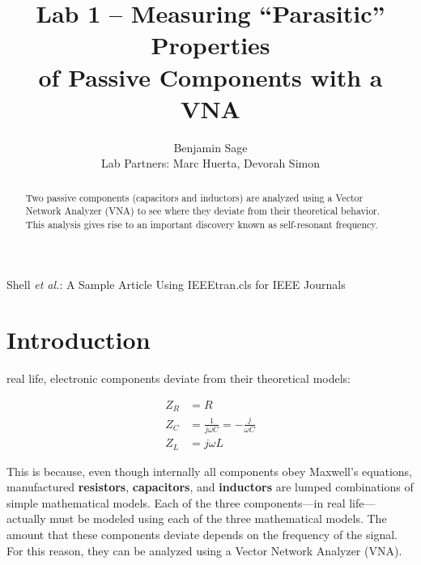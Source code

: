 \documentclass[lettersize,journal]{IEEEtran}
\begin{document}
\title{Lab 1 -- Measuring ``Parasitic'' Properties\\of Passive Components with a VNA}

\author{Benjamin Sage\\Lab Partners: Marc Huerta, Devorah Simon}

%
{Shell \MakeLowercase{\textit{et al.}}: A Sample Article Using IEEEtran.cls for IEEE Journals}


\maketitle

\begin{abstract}

Two passive components (capacitors and inductors) are analyzed using a Vector Network Analyzer (VNA) to see where they deviate from their theoretical behavior. This analysis gives rise to an important discovery known as self-resonant frequency. 
\end{abstract}


\section{Introduction}
 real life, electronic components deviate from their theoretical models:

\begin{align}
Z_R &= R \\
Z_C &= \frac{1}{j \omega C} = -\frac{j}{\omega C} \\
Z_L &= j \omega L
\end{align}

This is because, even though internally all components obey Maxwell's equations, manufactured {\bf{resistors}}, {\bf{capacitors}}, and {\bf{inductors}} are lumped combinations of simple mathematical models. Each of the three components---in real life---actually must be modeled using each of the three mathematical models. The amount that these components deviate depends on the frequency of the signal. For this reason, they can be analyzed using a Vector Network Analyzer (VNA).
\end{document}
